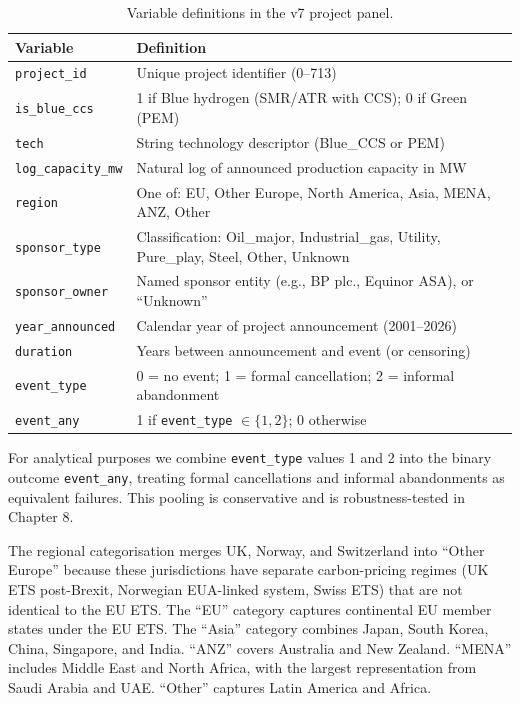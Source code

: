 \begin{table}[h!]
\centering
\caption{Variable definitions in the v7 project panel.}
\begin{tabular}{lp{10.5cm}}
\toprule
Variable & Definition \\
\midrule
\texttt{project\_id} & Unique project identifier (0--713) \\
\texttt{is\_blue\_ccs} & 1 if Blue hydrogen (SMR/ATR with CCS); 0 if Green (PEM) \\
\texttt{tech} & String technology descriptor (Blue\_CCS or PEM) \\
\texttt{log\_capacity\_mw} & Natural log of announced production capacity in MW \\
\texttt{region} & One of: EU, Other Europe, North America, Asia, MENA, ANZ, Other \\
\texttt{sponsor\_type} & Classification: Oil\_major, Industrial\_gas, Utility, Pure\_play, Steel, Other, Unknown \\
\texttt{sponsor\_owner} & Named sponsor entity (e.g., BP plc., Equinor ASA), or ``Unknown'' \\
\texttt{year\_announced} & Calendar year of project announcement (2001--2026) \\
\texttt{duration} & Years between announcement and event (or censoring) \\
\texttt{event\_type} & 0 = no event; 1 = formal cancellation; 2 = informal abandonment \\
\texttt{event\_any} & 1 if \texttt{event\_type} $\in \{1, 2\}$; 0 otherwise \\
\bottomrule
\end{tabular}
\label{tab:ch4-variables}
\end{table}

For analytical purposes we combine \texttt{event\_type} values 1 and 2 into the binary outcome \texttt{event\_any}, treating formal cancellations and informal abandonments as equivalent failures. This pooling is conservative and is robustness-tested in Chapter 8.

The regional categorisation merges UK, Norway, and Switzerland into ``Other Europe'' because these jurisdictions have separate carbon-pricing regimes (UK ETS post-Brexit, Norwegian EUA-linked system, Swiss ETS) that are not identical to the EU ETS. The ``EU'' category captures continental EU member states under the EU ETS. The ``Asia'' category combines Japan, South Korea, China, Singapore, and India. ``ANZ'' covers Australia and New Zealand. ``MENA'' includes Middle East and North Africa, with the largest representation from Saudi Arabia and UAE. ``Other'' captures Latin America and Africa.

